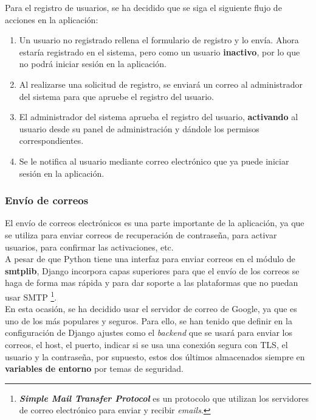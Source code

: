 Para el registro de usuarios, se ha decidido que se siga el siguiente flujo de acciones en
la aplicación:

    \begin{enumerate}
        \item Un usuario no registrado rellena el formulario de registro y lo envía. Ahora
        estaría registrado en el sistema, pero como un usuario \textbf{inactivo}, por lo
        que no podrá iniciar sesión en la aplicación.
        \item Al realizarse una solicitud de registro, se enviará un correo al administrador
        del sistema para que apruebe el registro del usuario.
        \item El administrador del sistema aprueba el registro del usuario, \textbf{activando}
        al usuario desde su panel de administración y dándole los permisos correspondientes.
        \item Se le notifica al usuario mediante correo electrónico que ya puede iniciar
        sesión en la aplicación.
    \end{enumerate}

\subsubsection{Envío de correos} \label{subsubsec:send-mails}
El envío de correos electrónicos es una parte importante de la aplicación, ya que se
utiliza para enviar correos de recuperación de contraseña, para activar usuarios, para
confirmar las activaciones, etc.\\

A pesar de que Python tiene una interfaz para enviar correos en el módulo de
\textbf{smtplib}, Django incorpora capas superiores para que el envío de los correos se
haga de forma mas rápida y para dar soporte a las plataformas que no puedan usar SMTP
\footnote{\textbf{\textit{Simple Mail Transfer Protocol}} es un protocolo que utilizan los servidores
de correo electrónico para enviar y recibir \textit{emails}.}.\\

En esta ocasión, se ha decidido usar el servidor de correo de Google, ya que es uno de los
más populares y seguros. Para ello, se han tenido que definir en la configuración de
Django ajustes como el \textit{backend} que se usará para enviar los correos, el host, el
puerto, indicar si se usa una conexión segura con TLS, el usuario y la contraseña, por
supuesto, estos dos últimos almacenados siempre en \textbf{variables de entorno} por temas
de seguridad.\\

